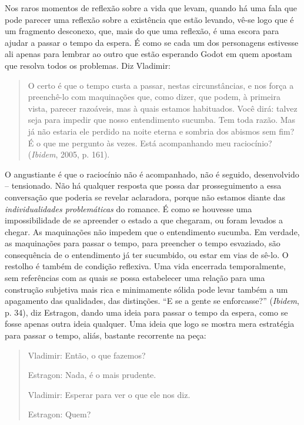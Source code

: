 {Nos raros momentos de reflexão sobre a vida que levam, quando há uma
fala que pode parecer uma reflexão sobre a existência que estão levando,
vê-se logo que é um fragmento desconexo, que, mais do que uma reflexão,
é uma escora para ajudar a passar o tempo da espera. É como se cada um
dos personagens estivesse ali apenas para lembrar ao outro que estão
esperando Godot em quem apostam que resolva todos os problemas. Diz
Vladimir:

\begin{quote}
O certo é que o tempo custa a passar, nestas circunstâncias, e nos força
a preenchê-lo com maquinações que, como dizer, que podem, à primeira
vista, parecer razoáveis, mas à quais estamos habituados. Você dirá:
talvez seja para impedir que nosso entendimento sucumba. Tem toda razão.
Mas já não estaria ele perdido na noite eterna e sombria dos abismos sem
fim? É o que me pergunto às vezes. Está acompanhando meu raciocínio?
(\emph{Ibidem}, 2005, p. 161).
\end{quote}

O angustiante é que o raciocínio não é acompanhado, não é seguido,
desenvolvido -- tensionado. Não há qualquer resposta que possa dar
prosseguimento a essa conversação que poderia se revelar aclaradora,
porque não estamos diante das \emph{individualidades problemáticas} do
romance. É como se houvesse uma impossibilidade de se apreender o estado
a que chegaram, ou foram levados a chegar. As maquinações não impedem
que o entendimento sucumba. Em verdade, as maquinações para passar o
tempo, para preencher o tempo esvaziado, são consequência de o
entendimento já ter sucumbido, ou estar em vias de sê-lo. O restolho é
também de condição reflexiva. Uma vida encerrada temporalmente, sem
referências com as quais se possa estabelecer uma relação para uma
construção subjetiva mais rica e minimamente sólida pode levar também a
um apagamento das qualidades, das distinções. ``E se a gente se
enforcasse?'' (\emph{Ibidem}, p. 34), diz Estragon, dando uma ideia para
passar o tempo da espera, como se fosse apenas outra ideia qualquer. Uma
ideia que logo se mostra mera estratégia para passar o tempo, aliás,
bastante recorrente na peça:

\begin{quote}
\forceindent{}Vladimir: Então, o que fazemos?

Estragon: Nada, é o mais prudente.

Vladimir: Esperar para ver o que ele nos diz.

Estragon: Quem?


\end{quote}}
